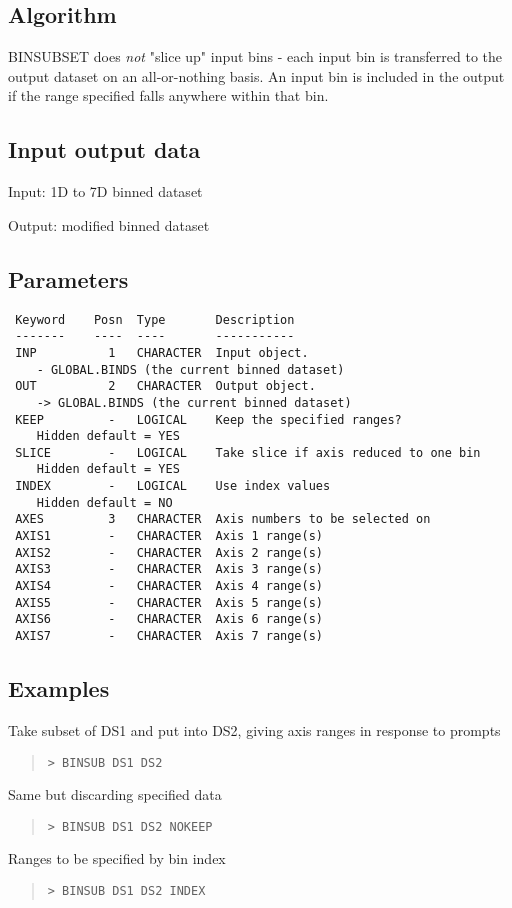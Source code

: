 \documentclass{book}
\renewcommand{\_}{{\tt\char'137}}     %
\begin{document}
\subsection{Algorithm}
BINSUBSET does {\em not} "slice up" input bins - each input bin is
transferred to the output dataset on an all-or-nothing basis.
An input bin is included in the output if the range specified
falls anywhere within that bin.

\subsection{Input output data}
Input: 1D to 7D binned dataset

Output: modified binned dataset

\subsection{Parameters}
\begin{verbatim}
 Keyword    Posn  Type       Description
 -------    ----  ----       -----------
 INP          1   CHARACTER  Input object.
    - GLOBAL.BINDS (the current binned dataset)
 OUT          2   CHARACTER  Output object.
    -> GLOBAL.BINDS (the current binned dataset)
 KEEP         -   LOGICAL    Keep the specified ranges?
    Hidden default = YES
 SLICE        -   LOGICAL    Take slice if axis reduced to one bin
    Hidden default = YES
 INDEX        -   LOGICAL    Use index values
    Hidden default = NO
 AXES         3   CHARACTER  Axis numbers to be selected on
 AXIS1        -   CHARACTER  Axis 1 range(s)
 AXIS2        -   CHARACTER  Axis 2 range(s)
 AXIS3        -   CHARACTER  Axis 3 range(s)
 AXIS4        -   CHARACTER  Axis 4 range(s)
 AXIS5        -   CHARACTER  Axis 5 range(s)
 AXIS6        -   CHARACTER  Axis 6 range(s)
 AXIS7        -   CHARACTER  Axis 7 range(s)

\end{verbatim}\subsection{Examples}
Take subset of DS1 and put into DS2, giving axis ranges in response
to prompts
\begin{quote}\begin{verbatim}
> BINSUB DS1 DS2
\end{verbatim}\end{quote}
Same but discarding specified data
\begin{quote}\begin{verbatim}
> BINSUB DS1 DS2 NOKEEP
\end{verbatim}\end{quote}
Ranges to be specified by bin index
\begin{quote}\begin{verbatim}
> BINSUB DS1 DS2 INDEX
\end{verbatim}\end{quote}
\end{document}
